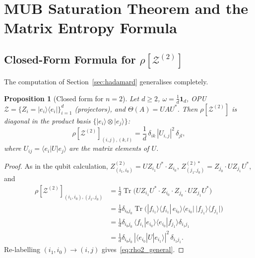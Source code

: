 \documentclass[12pt,a4paper]{article}
\newtheorem{proposition}[theorem]{Proposition}
\DeclareMathOperator{\Tr}{Tr}
\begin{document}
\section{MUB Saturation Theorem and the Matrix Entropy Formula}
\label{sec:mub}

\subsection{Closed-Form Formula for \texorpdfstring{$\rho[\mathcal{Z}^{(2)}]$}{rho[Z(2)]}}

The computation of Section~\ref{sec:hadamard} generalises completely.

\begin{proposition}[Closed form for $n=2$]\label{prop:rho2_formula}
Let $d\geq 2$, $\omega=\frac{1}{d}\mathbf{1}_d$, OPU $\mathcal{Z}=\{Z_i=|e_i\rangle\langle e_i|\}_{i=1}^d$
(projectors), and $\Theta(A)=UAU^*$.  Then $\rho[\mathcal{Z}^{(2)}]$ is
\emph{diagonal} in the product basis $\{|e_i\rangle\otimes|e_j\rangle\}$:
\begin{equation}\label{eq:rho2_general}
  \rho[\mathcal{Z}^{(2)}]_{(i,j),(k,l)}
  = \frac{1}{d}\,\delta_{ik}\,|U_{i,j}|^2\,\delta_{jl},
\end{equation}
where $U_{ij}=\langle e_i|U|e_j\rangle$ are the matrix elements of $U$.
\end{proposition}
\begin{proof}
As in the qubit calculation,
$Z^{(2)}_{(i_1,i_0)}=UZ_{i_1}U^*\cdot Z_{i_0}$,
$Z^{(2)*}_{(j_1,j_0)}=Z_{j_0}\cdot UZ_{j_1}U^*$,
and
\begin{align*}
  \rho[\mathcal{Z}^{(2)}]_{(i_1,i_0),(j_1,j_0)}
  &=\tfrac{1}{d}\Tr\!\bigl(UZ_{i_1}U^*\cdot Z_{i_0}\cdot Z_{j_0}\cdot UZ_{j_1}U^*\bigr)\\
  &=\tfrac{1}{d}\delta_{i_0 j_0}
    \Tr\!\bigl(|f_{i_1}\rangle\langle f_{i_1}|\,e_{i_0}\rangle\langle e_{i_0}|\,|f_{j_1}\rangle\langle f_{j_1}|\bigr)\\
  &=\tfrac{1}{d}\delta_{i_0 j_0}\,\langle f_{i_1}|e_{i_0}\rangle\langle e_{i_0}|f_{j_1}\rangle\delta_{i_1 j_1}\\
  &=\tfrac{1}{d}\delta_{i_0 j_0}\,|\langle e_{i_0}|U|e_{i_1}\rangle|^2\,\delta_{i_1 j_1}.
\end{align*}
Re-labelling $(i_1,i_0)\to(i,j)$ gives~\eqref{eq:rho2_general}.
\end{proof}
\end{document}
